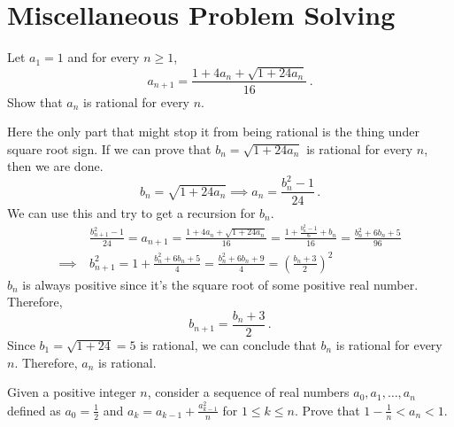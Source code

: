 \documentclass[11pt]{scrartcl}
\begin{document}
\section{Miscellaneous Problem Solving}
\begin{exercise}
Let \(a_1 = 1\) and for every \(n \ge 1\),
\[ a_{n+1} = \frac{1+4a_n+ \sqrt{1+24a_n}}{16} \, . \]
Show that \(a_n\) is rational for every \(n\).
\end{exercise}
\begin{soln}
Here the only part that might stop it from being rational is the thing under square root sign. If we can prove that \(b_n = \sqrt{1+24a_n}\) is rational for every \(n\), then we are done.
\[b_n = \sqrt{1+24a_n} \implies a_n = \frac{b_n^2 -1}{24}\, .\]
We can use this and try to get a recursion for \(b_n\).
\begin{equation*}
\begin{split}
&\frac{b_{n+1}^2 -1}{24} = a_{n+1} = \frac{1+4a_n+ \sqrt{1+24a_n}}{16} = \frac{1+\frac{b_n^2 -1}{6}+ b_n}{16} = \frac{b_n^2+6b_n+5}{96} \\
\implies \ & {b_{n+1}^2} = 1+ \frac{b_n^2+6b_n+5}{4} = \frac{b_n^2+6b_n+9}{4} = \left(\frac{b_n+3}{2}\right) ^2
\end{split}
\end{equation*}
\(b_n\) is always positive since it's the square root of some positive real number. Therefore,
\[ b_{n+1} = \frac{b_n+3}{2} \, .\]
Since \(b_1 = \sqrt{1+24} = 5\) is rational, we can conclude that \(b_n\) is rational for every \(n\). Therefore, \(a_n\) is rational.
\end{soln}
\begin{exercise}
Given a positive integer \(n\), consider a sequence of real numbers \(a_{0}, a_{1}, \ldots, a_{n}\) defined as \(a_{0}=\frac{1}{2}\) and \(a_{k}=a_{k-1}+\frac{a_{k-1}^{2}}{n}\) for \(1 \leq k \leq n\). Prove that \(1-\frac{1}{n}<a_{n}<1\).
\end{exercise}
\end{document}
